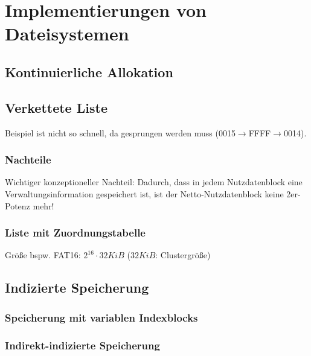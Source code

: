 
\section{Implementierungen von Dateisystemen}
\subsection{Kontinuierliche Allokation}

\subsection{Verkettete Liste}
Beispiel ist nicht so schnell, da gesprungen werden muss (0015$\to$FFFF$\to$0014).\\
\subsubsection{Nachteile}
Wichtiger konzeptioneller Nachteil: Dadurch, dass in jedem Nutzdatenblock eine Verwaltungsinformation gespeichert ist, ist der Netto-Nutzdatenblock keine 2er-Potenz mehr!
\subsubsection{Liste mit Zuordnungstabelle}
Größe bspw. FAT16: $2^{16}\cdot 32 \unit{KiB}$ ($32\unit{KiB}$: Clustergröße)

\subsection{Indizierte Speicherung}
\subsubsection{Speicherung mit variablen Indexblocks}
\subsubsection{Indirekt-indizierte Speicherung}


